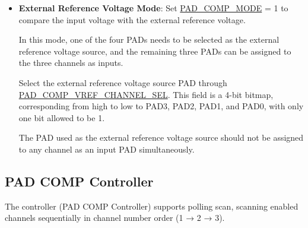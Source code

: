 \documentclass[main\_\_EN.tex]{subfiles}
\begin{document}
\begin{itemize}
    \item \textbf{External Reference Voltage Mode}: Set \hyperref[fielddesc:PADCOMPMODE]{PAD\_COMP\_MODE} = 1 to compare the input voltage with the external reference voltage.

    In this mode, one of the four PADs needs to be selected as the external reference voltage source, and the remaining three PADs can be assigned to the three channels as inputs.

    Select the external reference voltage source PAD through \hyperref[fielddesc:PADCOMPVREFCHANNELSEL]{PAD\_COMP\_VREF\_CHANNEL\_SEL}. This field is a 4-bit bitmap, corresponding from high to low to PAD3, PAD2, PAD1, and PAD0, with only one bit allowed to be 1.

    \begin{tiplisting}
    The PAD used as the external reference voltage source should not be assigned to any channel as an input PAD simultaneously.
    \end{tiplisting}

\end{itemize}

\subsection{PAD COMP Controller}
\label{subsec:anacom-controller}
             
The controller (PAD COMP Controller) supports polling scan, scanning enabled channels sequentially in channel number order (1 → 2 → 3).
\end{document}
